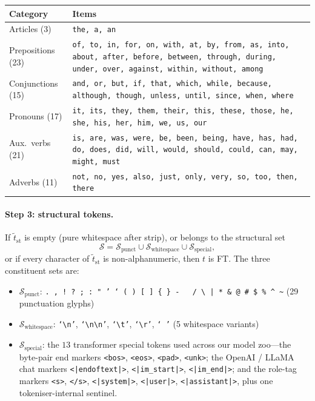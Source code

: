 \begin{center}
\footnotesize
\begin{tabular}{@{}lp{9.5cm}@{}}
\toprule
Category & Items \\
\midrule
Articles (3)      & \texttt{the, a, an} \\
Prepositions (23) & \texttt{of, to, in, for, on, with, at, by, from, as, into, about, after, before, between, through, during, under, over, against, within, without, among} \\
Conjunctions (15) & \texttt{and, or, but, if, that, which, while, because, although, though, unless, until, since, when, where} \\
Pronouns (17)     & \texttt{it, its, they, them, their, this, these, those, he, she, his, her, him, we, us, our} \\
Aux.\ verbs (21)  & \texttt{is, are, was, were, be, been, being, have, has, had, do, does, did, will, would, should, could, can, may, might, must} \\
Adverbs (11)      & \texttt{not, no, yes, also, just, only, very, so, too, then, there} \\
\bottomrule
\end{tabular}
\end{center}

\paragraph{Step 3: structural tokens.}
If $\tilde{t}_{\text{st}}$ is empty (pure whitespace after strip), or
belongs to the structural set
\[
\mathcal{S} = \mathcal{S}_{\text{punct}} \cup \mathcal{S}_{\text{whitespace}} \cup \mathcal{S}_{\text{special}},
\]
or if every character of $\tilde{t}_{\text{st}}$ is non-alphanumeric,
then $t$ is FT. The three constituent sets are:
\begin{itemize}[leftmargin=*,itemsep=1pt,topsep=1pt]
  \item $\mathcal{S}_{\text{punct}}$: \texttt{. ,\ !\ ?\ ;\ :\ " '\ `\ (\ )\ [\ ]\ \{\ \}\ -\ \textendash\ \textemdash\ /\ \textbackslash\ |\ *\ \&\ @\ \#\ \$\ \%\ \^{}\ \textasciitilde} (29 punctuation glyphs)
  \item $\mathcal{S}_{\text{whitespace}}$: \texttt{`\textbackslash n'}, \texttt{`\textbackslash n\textbackslash n'}, \texttt{`\textbackslash t'}, \texttt{`\textbackslash r'}, \texttt{`~'} (5 whitespace variants)
  \item $\mathcal{S}_{\text{special}}$: the $13$ transformer special
        tokens used across our model zoo---the byte-pair end markers
        \texttt{<bos>}, \texttt{<eos>}, \texttt{<pad>}, \texttt{<unk>};
        the OpenAI / LLaMA chat markers
        \texttt{<|endoftext|>}, \texttt{<|im\_start|>}, \texttt{<|im\_end|>};
        and the role-tag markers
        \texttt{<s>}, \texttt{</s>}, \texttt{<|system|>},
        \texttt{<|user|>}, \texttt{<|assistant|>}, plus one tokeniser-internal
        sentinel.
\end{itemize}

